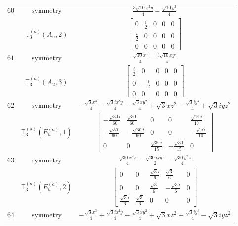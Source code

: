 \documentclass[fleqn,8pt,landscape]{jsarticle}
\begin{document}
\begin{longtable}{ccc}
$ 60 $ & $ \text{symmetry} $ & $ \frac{3 \sqrt{10} x^{2} y}{4} - \frac{\sqrt{10} y^{3}}{4} $ \\
$  $ & $ \mathbb{T}_{3}^{(a)}(A_{u},2) $ & $ \begin{bmatrix} 0 & \frac{i}{2} & 0 & 0 & 0 \\ \frac{i}{2} & 0 & 0 & 0 & 0 \\ 0 & 0 & 0 & 0 & 0 \end{bmatrix} $ \\ \hline
$ 61 $ & $ \text{symmetry} $ & $ \frac{\sqrt{10} x^{3}}{4} - \frac{3 \sqrt{10} x y^{2}}{4} $ \\
$  $ & $ \mathbb{T}_{3}^{(a)}(A_{u},3) $ & $ \begin{bmatrix} \frac{i}{2} & 0 & 0 & 0 & 0 \\ 0 & - \frac{i}{2} & 0 & 0 & 0 \\ 0 & 0 & 0 & 0 & 0 \end{bmatrix} $ \\ \hline
$ 62 $ & $ \text{symmetry} $ & $ - \frac{\sqrt{3} x^{3}}{4} - \frac{\sqrt{3} i x^{2} y}{4} - \frac{\sqrt{3} x y^{2}}{4} + \sqrt{3} x z^{2} - \frac{\sqrt{3} i y^{3}}{4} + \sqrt{3} i y z^{2} $ \\
$  $ & $ \mathbb{T}_{3}^{(a)}(E_{u}^{(a)},1) $ & $ \begin{bmatrix} - \frac{\sqrt{30} i}{60} & \frac{\sqrt{30}}{60} & 0 & 0 & \frac{\sqrt{10} i}{10} \\ - \frac{\sqrt{30}}{60} & - \frac{\sqrt{30} i}{60} & 0 & 0 & - \frac{\sqrt{10}}{10} \\ 0 & 0 & \frac{\sqrt{30} i}{15} & - \frac{\sqrt{30}}{15} & 0 \end{bmatrix} $ \\ \hline
$ 63 $ & $ \text{symmetry} $ & $ \frac{\sqrt{30} x^{2} z}{4} - \frac{\sqrt{30} i x y z}{2} - \frac{\sqrt{30} y^{2} z}{4} $ \\
$  $ & $ \mathbb{T}_{3}^{(a)}(E_{u}^{(a)},2) $ & $ \begin{bmatrix} 0 & 0 & \frac{\sqrt{3} i}{6} & \frac{\sqrt{3}}{6} & 0 \\ 0 & 0 & \frac{\sqrt{3}}{6} & - \frac{\sqrt{3} i}{6} & 0 \\ \frac{\sqrt{3} i}{6} & \frac{\sqrt{3}}{6} & 0 & 0 & 0 \end{bmatrix} $ \\ \hline
$ 64 $ & $ \text{symmetry} $ & $ - \frac{\sqrt{3} x^{3}}{4} + \frac{\sqrt{3} i x^{2} y}{4} - \frac{\sqrt{3} x y^{2}}{4} + \sqrt{3} x z^{2} + \frac{\sqrt{3} i y^{3}}{4} - \sqrt{3} i y z^{2} $ \\

\end{longtable}
\end{document}
